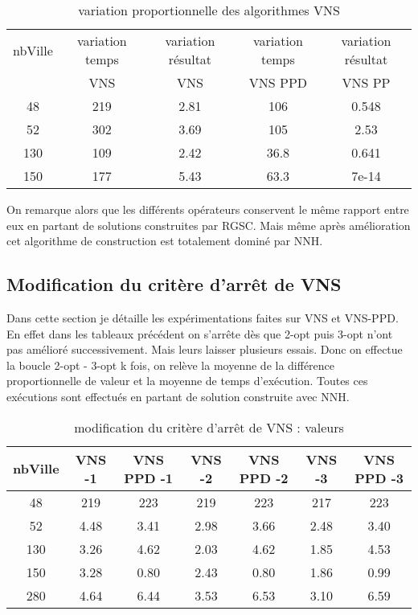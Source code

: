 \documentclass[12pt,a4paper]{article}
\begin{document}
\begin{table}[!h]
\centering
\begin{tabular}{|*{5}{c|}}
  \hline
  nbVille & variation temps & variation résultat & variation temps & variation résultat \\
  ~ & VNS & VNS & VNS PPD & VNS PP \\
  \hline
  48 & 219 & 2.81 & 106 & 0.548 \\ 
  52 & 302 & 3.69 & 105 & 2.53 \\
  130 & 109 & 2.42 & 36.8 & 0.641 \\
  150 & 177 & 5.43 & 63.3 & 7e-14 \\
  \hline
\end{tabular}
\caption{variation proportionnelle des algorithmes VNS}
\label{variationVNSRGSC}
\end{table}

On remarque alors que les différents opérateurs conservent le même rapport entre eux en partant de solutions construites par RGSC. Mais même après amélioration cet algorithme de construction est totalement dominé par NNH.\\

\subsection{Modification du critère d’arrêt de VNS}

Dans cette section je détaille les expérimentations faites sur VNS et VNS-PPD. En effet dans les tableaux précédent on s'arrête dès que 2-opt puis 3-opt n'ont pas amélioré successivement. Mais leurs laisser plusieurs essais. Donc on effectue la boucle 2-opt - 3-opt k fois, on relève la moyenne de la différence proportionnelle de valeur et la moyenne de temps d’exécution. Toutes ces exécutions sont effectués en partant de solution construite avec NNH.

\begin{table}[!h]
\centering
\begin{tabular}{|*{7}{c|}}
  \hline
  nbVille & VNS -1 & VNS PPD -1 & VNS -2 & VNS PPD -2 & VNS -3 & VNS PPD -3 \\
  \hline
  48 & 219 & 223 & 219 & 223 & 217 & 223 \\ 
  52 & 4.48 & 3.41 & 2.98 & 3.66 & 2.48 & 3.40 \\
  130 & 3.26 & 4.62 & 2.03 & 4.62 & 1.85 & 4.53 \\
  150 & 3.28 & 0.80 & 2.43 & 0.80 & 1.86 & 0.99 \\ 
  280 & 4.64 & 6.44 & 3.53 & 6.53 & 3.10 & 6.59 \\
  \hline
\end{tabular}
\caption{modification du critère d’arrêt de VNS : valeurs}
\label{stopingRuleVNSval}
\end{table}
\end{document}
